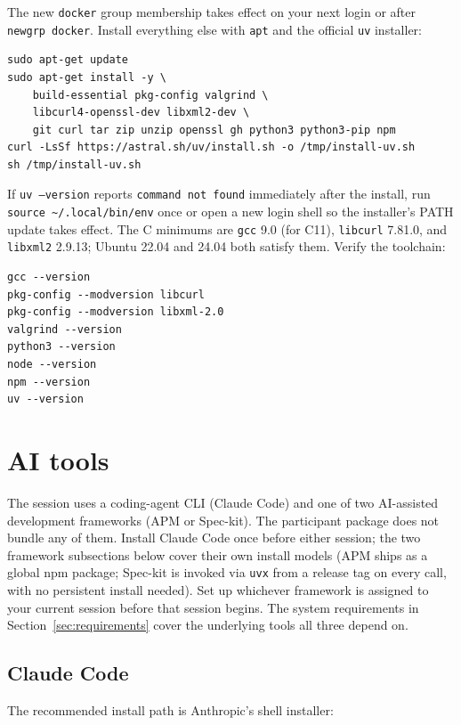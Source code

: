 \documentclass[11pt, a4paper]{article}
\begin{document}
The new \texttt{docker} group membership takes effect on your next login or after \texttt{newgrp docker}. Install everything else with \texttt{apt} and the official \texttt{uv} installer:

\begin{verbatim}
sudo apt-get update
sudo apt-get install -y \
    build-essential pkg-config valgrind \
    libcurl4-openssl-dev libxml2-dev \
    git curl tar zip unzip openssl gh python3 python3-pip npm
curl -LsSf https://astral.sh/uv/install.sh -o /tmp/install-uv.sh
sh /tmp/install-uv.sh
\end{verbatim}

If \texttt{uv --version} reports \texttt{command not found} immediately after the install, run \texttt{source \textasciitilde/.local/bin/env} once or open a new login shell so the installer's PATH update takes effect. The C minimums are \texttt{gcc} 9.0 (for C11), \texttt{libcurl} 7.81.0, and \texttt{libxml2} 2.9.13; Ubuntu 22.04 and 24.04 both satisfy them. Verify the toolchain:

\begin{verbatim}
gcc --version
pkg-config --modversion libcurl
pkg-config --modversion libxml-2.0
valgrind --version
python3 --version
node --version
npm --version
uv --version
\end{verbatim}

\section{AI tools}
\label{sec:aitools}

The session uses a coding-agent CLI (Claude Code) and one of two AI-assisted development frameworks (APM or Spec-kit). The participant package does not bundle any of them. Install Claude Code once before either session; the two framework subsections below cover their own install models (APM ships as a global npm package; Spec-kit is invoked via \texttt{uvx} from a release tag on every call, with no persistent install needed). Set up whichever framework is assigned to your current session before that session begins. The system requirements in Section~\ref{sec:requirements} cover the underlying tools all three depend on.

\subsection{Claude Code}
\label{sec:aitools:claude}

The recommended install path is Anthropic's shell installer:
\end{document}
